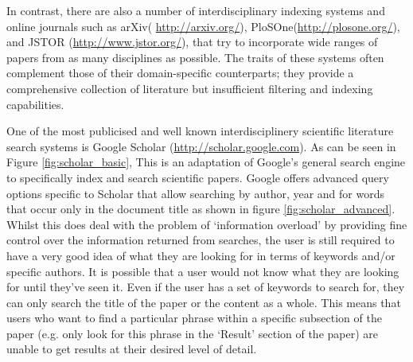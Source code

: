 In contrast, there are also a number of interdisciplinary indexing systems and
online journals such as arXiv( \url{http://arxiv.org/}),
PloSOne(\url{http://plosone.org/}), and JSTOR (\url{http://www.jstor.org/}),
that try to incorporate wide ranges of papers from as many disciplines as
possible. The traits of these systems often complement those of their
domain-specific counterparts; they provide a comprehensive collection of
literature but insufficient filtering and indexing capabilities.

One of the most publicised and well known interdisciplinery scientific
literature search systems is Google Scholar (\url{http://scholar.google.com}).
As can be seen in Figure \ref{fig:scholar_basic}, This is an adaptation of
Google's general search engine to specifically index and search scientific
papers.  Google offers advanced query options specific to Scholar that allow
searching by author, year and for words that occur only in the document title
as shown in figure \ref{fig:scholar_advanced}. Whilst this does deal with the
problem of `information overload' by providing fine control over the
information returned from searches,  the user is still required to have a very
good idea of what they are looking for in terms of keywords and/or specific
authors. It is possible that a user would not know what they are looking for
until they've seen it. Even if the user has a set of keywords to search for,
they can only search the title of the paper or the content as a whole. This
means that users who want to find a particular phrase within a specific
subsection of the paper (e.g.  only look for this phrase in the `Result'
section of the paper) are unable to get results at their desired level of
detail.

